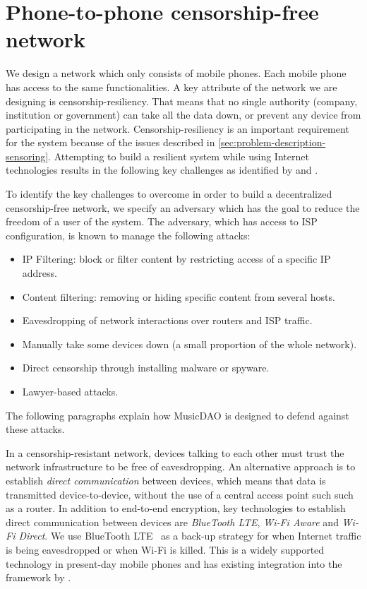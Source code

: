\section{Phone-to-phone censorship-free network}
We design a network which only consists of mobile phones. Each mobile phone has access to the same functionalities. A key attribute of the network we are designing is  censorship-resiliency. That means that no single authority (company, institution or government) can take all the data down, or prevent any device from participating in the network. Censorship-resiliency is an important requirement for the system because of the issues described in \ref{sec:problem-description-sensoring}. Attempting to build a resilient system while using Internet technologies results in the following key challenges as identified by \cite{pouwelse2012censorship} and \cite{di2014bypassing}.

To identify the key challenges to overcome in order to build a decentralized censorship-free network, we specify an adversary which has the goal to reduce the freedom of a user of the system. The adversary, which has access to ISP configuration, is known to manage the following attacks:
\begin{itemize}
    \item IP Filtering: block or filter content by restricting access of a specific IP address.
    \item Content filtering: removing or hiding specific content from several hosts.
    \item Eavesdropping of network interactions over routers and ISP traffic.
    \item Manually take some devices down (a small proportion of the whole network).
    \item Direct censorship through installing malware or spyware.
    \item Lawyer-based attacks.
\end{itemize}
The following paragraphs explain how MusicDAO is designed to defend against these attacks.

In a censorship-resistant network, devices talking to each other must trust the network infrastructure to be free of eavesdropping. An alternative approach is to establish \textit{direct communication} between devices, which means that data is transmitted device-to-device, without the use of a central access point such such as a router. In addition to end-to-end encryption, key technologies to establish direct communication between devices are \textit{BlueTooth LTE}, \textit{Wi-Fi Aware} and \textit{Wi-Fi Direct}. We use BlueTooth LTE~\citep{townsend2014getting} as a back-up strategy for when Internet traffic is being eavesdropped or when Wi-Fi is killed. This is a widely supported technology in present-day mobile phones and has existing integration into the framework by \cite{mattskala2020}.

